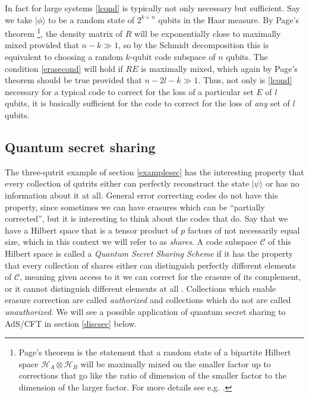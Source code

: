\documentclass[11pt]{article}
\newcommand{\ran}{\rangle}
\begin{document}
In fact for large systems \eqref{lcond} is typically not only necessary but sufficient.  Say we take $|\phi\ran$ to be a random state of $2^{k+n}$ qubits in the Haar measure.  By Page's theorem \cite{Page:1993df}\footnote{Page's theorem is the statement that a random state of a bipartite Hilbert space $\mathcal{H}_A\otimes \mathcal{H}_B$ will be maximally mixed on the smaller factor up to corrections that go like the ratio of dimension of the smaller factor to the dimension of the larger factor.  For more details see e.g. \cite{Harlow:2014yka}.}, the density matrix of $R$ will be exponentially close to maximally mixed provided that $n-k\gg 1$, so by the Schmidt decomposition this is equivalent to choosing a random $k$-qubit code subspace of $n$ qubits.  The condition \eqref{erasecond} will hold if $RE$ is maximally mixed, which again by Page's theorem should be true provided that $n-2l-k \gg 1$. Thus, not only is \eqref{lcond} necessary for a typical code to correct for the loss of a particular set $E$ of $l$ qubits, it is basically sufficient for the code to correct for the loss of \textit{any} set of $l$ qubits.   

\subsection{Quantum secret sharing}\label{qsssec}
The three-qutrit example of section \ref{examplesec} has the interesting property that every collection of qutrits either can perfectly reconstruct the state $|\psi\ran$ or has no information about it at all.  General error correcting codes do not have this property, since sometimes we can have erasures which can be ``partially corrected'', but it is interesting to think about the codes that do. Say that we have a Hilbert space that is a tensor product of $p$ factors of not necessarily equal size, which in this context we will refer to as \textit{shares}.  A code subspace $\mathcal{C}$ of this Hilbert space is called a \textit{Quantum Secret Sharing Scheme} if it has the property that every collection of shares either can distinguish perfectly different elements of $\mathcal{C}$, meaning given access to it we can correct for the erasure of its complement, or it cannot distinguish different elements at all \cite{Cleve:1999qg}.  Collections which enable erasure correction are called \textit{authorized} and collections which do not are called \textit{unauthorized}.  We will see a possible application of quantum secret sharing to AdS/CFT in section \ref{discsec} below.
\end{document}
